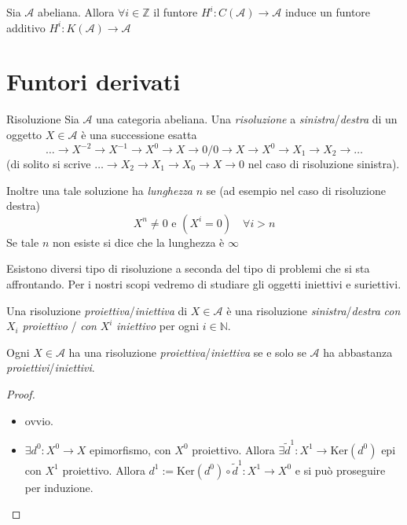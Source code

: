 \begin{corollary}{}
    Sia \(\mathcal{A}\) abeliana. Allora \(\forall i \in \mathbb{Z}\) il funtore
    \(H^{i} : C{(\mathcal{A})} \to \mathcal{A}\) induce un funtore additivo
    \(H^{i} : K{(\mathcal{A})} \to \mathcal{A}\) 
\end{corollary}

\section{Funtori derivati}

\begin{definition}{Risoluzione}
    Sia \(\mathcal{A}\) una categoria abeliana. Una \emph{risoluzione} a
    \emph{sinistra}/\emph{destra} di un oggetto \(X \in \mathcal{A}\) è una
    successione esatta 
    \[
     \dots \to X^{-2} \to X^{-1} \to X^{0} \to X \to 0 / 0 \to X \to X^{0} \to
     X_{1} \to X_{2} \to \dots
    \] 
    (di solito si scrive \(\dots\to X_2 \to X_{1} \to X_{0} \to X \to
    0\) nel caso di risoluzione sinistra).

    Inoltre una tale soluzione ha \emph{lunghezza} \(n\) se (ad esempio nel caso
    di risoluzione destra)
    \[
      X^{n} \neq 0 \text{ e } {(X^{i} = 0)} \quad \forall i > n
    \]
    Se tale \(n\) non esiste si dice che la lunghezza è \(\infty\) 
\end{definition}

Esistono diversi tipo di risoluzione a seconda del tipo di problemi che si sta
affrontando. Per i nostri scopi vedremo di studiare gli oggetti iniettivi e
suriettivi.

\begin{definition}{}
    Una risoluzione \emph{proiettiva}/\emph{iniettiva} di \(X \in \mathcal{A}\)
    è una risoluzione \emph{sinistra}/\emph{destra} \emph{con} \(X_{i}\)
    \emph{proiettivo} / \emph{con }\(X^{i}\) \emph{iniettivo} per ogni \(i \in
    \mathbb{N}\).
\end{definition}

\begin{proposition}{}
    Ogni \(X \in \mathcal{A}\) ha una risoluzione
    \emph{proiettiva}/\emph{iniettiva} se e solo se \(\mathcal{A}\) ha
    abbastanza \emph{proiettivi}/\emph{iniettivi}.
\end{proposition}
\begin{proof}\( \)
\begin{itemize}
    \item[\(\implies \)] ovvio.
    \item[\(\impliedby \)] \(\exists d^{0} : X^{0} \to X\) epimorfismo, con
        \(X^{0}\) proiettivo. Allora \(\exists \tilde{d}^{1} : X^{1} \to
        \mathrm{Ker}{(d^{0})}\) epi con \(X^{1}\) proiettivo. Allora \(d^{1} :=
        \mathrm{Ker}{(d^{0})} \circ \tilde{d}^{1} : X^{1} \to X^{0}\) e si può
        proseguire per induzione.
\end{itemize}
\end{proof}

